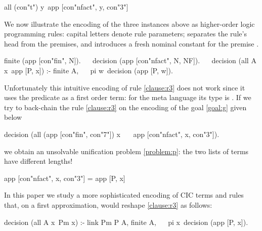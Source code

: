 \documentclass[sigconf,natbib=false,review]{acmart}
\begin{document}
\begin{elpicode}
all (con"t") y\ app [con"nfact", y, con"3"]
\end{elpicode}

\noindent
We now illustrate the encoding of the three instances above as higher-order
logic programming rules: capital letters denote rule
parameters; \elpiIn{:-} separates the rule's head from the premises, and
 introduces a fresh nominal constant 
for the premise .

\begin{elpicode}
finite   (app [con"fin", N]).                         ~~
decision (app [con"nfact", N, NF]).                   ~~
decision (all A x\ app [P, x]) :- finite A,           ~~
  pi w\ decision (app [P, w]).
\end{elpicode}

\noindent
Unfortunately this intuitive encoding of rule \ref{clause:r3} does not work
since it uses the predicate  as a first order term: for the meta
language its type is . If we try to back-chain the rule
\ref{clause:r3} on the encoding of the goal \ref{goal:g} given below

\begin{elpicode}
decision (all (app [con"fin", con"7"]) x\              ~~
  app [con"nfact", x, con"3"]).
\end{elpicode}

\noindent
we obtain an unsolvable unification problem \ref{problem:p}:
the two lists of terms have different lengths!

\begin{elpicode}
app [con"nfact", x, con"3"] = app [P, x]               ~~
\end{elpicode}

\noindent
In this paper we study a more sophisticated encoding of CIC terms and rules
that, on a first approximation, would reshape \ref{clause:r3} as follows:

\begin{elpicode}
decision (all A x\ Pm x) :- link Pm P A, finite A,    ~~
  pi x\ decision (app [P, x]).
\end{elpicode}
\end{document}
